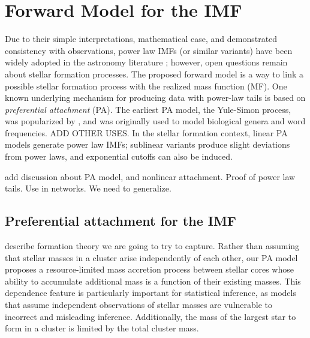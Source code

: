 \documentclass[12pt]{article}
\begin{document}
\section{Forward Model for the IMF}
\label{PAmodelSection}
Due to their simple interpretations, mathematical ease, and demonstrated consistency with observations, power law IMFs (or similar variants) have been widely adopted in the astronomy literature \citep{kroupa2012}; however, open questions remain about stellar formation processes.  The proposed forward model is a way to link a possible stellar formation process with the realized mass function (MF).  One known underlying mechanism for producing data with power-law tails is based on {\em preferential attachment} (PA).  
The earliest PA model, the Yule-Simon process, was popularized by \cite{simon55}, and was originally used to model biological genera and word frequencies. {\color{red} ADD OTHER USES.}
In the stellar formation context, linear PA models generate power law IMFs; sublinear variants produce slight deviations from power laws, 
and exponential cutoffs can also be induced. 

\begin{center}
{\color{red}
add discussion about PA model, and nonlinear attachment.  Proof of power law tails.  Use in networks.  We need to generalize.
}
\end{center}


\subsection{Preferential attachment for the IMF}

{\color{red} describe formation theory we are going to try to capture.}  
Rather than assuming that stellar masses in a cluster arise independently of each other, our PA model proposes a resource-limited mass accretion process between stellar cores whose ability to accumulate additional mass is a function of their existing masses. 
This dependence feature is particularly important for statistical inference, as models that assume independent observations of stellar masses are vulnerable to incorrect and misleading inference. 
Additionally, the mass of the largest star to form in a cluster is limited by the total cluster mass.
\end{document}
